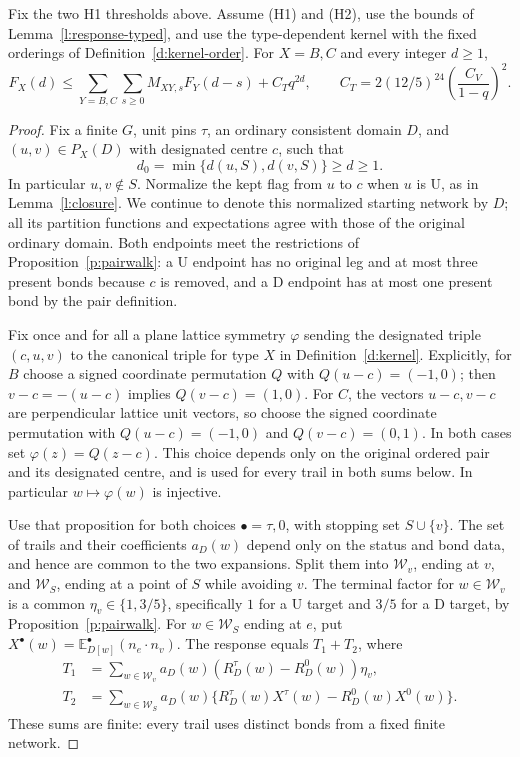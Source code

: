 \begin{lemma}\label{l:recineq}
Fix the two H1 thresholds above. Assume (H1) and (H2), use
the bounds of Lemma~\ref{l:response-typed}, and use the
type-dependent kernel with the fixed orderings of
Definition~\ref{d:kernel-order}.
For \(X=B,C\) and every integer \(d\ge1\),
\[
 F_X(d)\le\sum_{Y=B,C}\sum_{s\ge0}M_{XY,s}F_Y(d-s)+C_Tq^{2d},
 \qquad
 C_T=2(12/5)^{24}\left(\frac{C_V}{1-q}\right)^2 .
\]
\end{lemma}

\begin{proof}
Fix a finite \(G\), unit pins \(\tau\), an ordinary consistent
domain \(D\), and \((u,v)\in P_X(D)\) with designated centre
\(c\), such that
\[
 d_0=\min\{d(u,S),d(v,S)\}\ge d\ge1.
\]
In particular \(u,v\notin S\).  Normalize the kept flag from
\(u\) to \(c\) when \(u\) is \(\mathrm U\), as in
Lemma~\ref{l:closure}.  We continue to denote this normalized
starting network by \(D\); all its partition functions and
expectations agree with those of the original ordinary domain.
Both endpoints meet the restrictions of Proposition~\ref{p:pairwalk}:
a \(\mathrm U\) endpoint has no original leg and at most three
present bonds because \(c\) is removed, and a \(\mathrm D\)
endpoint has at most one present bond by the pair definition.

Fix once and for all a plane lattice symmetry \(\varphi\) sending
the designated triple \((c,u,v)\) to the canonical triple for
type \(X\) in Definition~\ref{d:kernel}.  Explicitly, for \(B\)
choose a signed coordinate permutation \(Q\) with
\(Q(u-c)=(-1,0)\); then \(v-c=-(u-c)\) implies
\(Q(v-c)=(1,0)\).  For \(C\), the vectors \(u-c,v-c\) are
perpendicular lattice unit vectors, so choose the signed coordinate
permutation with \(Q(u-c)=(-1,0)\) and \(Q(v-c)=(0,1)\).
In both cases set \(\varphi(z)=Q(z-c)\).  This choice depends
only on the original ordered pair and its designated centre,
and is used for every trail in both sums below.  In particular
\(w\mapsto\varphi(w)\) is injective.

Use that proposition for both choices \(\bullet=\tau,0\), with
stopping set \(S\cup\{v\}\).  The set of trails and their
coefficients \(a_D(w)\) depend only on the status and bond data,
and hence are common to the two expansions.  Split them into
\(\mathcal W_v\), ending at \(v\), and \(\mathcal W_S\),
ending at a point of \(S\) while avoiding \(v\).  The terminal
factor for \(w\in\mathcal W_v\) is a common
\(\eta_v\in\{1,3/5\}\), specifically \(1\) for a
\(\mathrm U\) target and \(3/5\) for a \(\mathrm D\) target,
by Proposition~\ref{p:pairwalk}.  For \(w\in\mathcal W_S\) ending
at \(e\), put
\(X^\bullet(w)=\mathbb E_{D[w]}^\bullet(n_e\cdot n_v)\).
The response equals \(T_1+T_2\), where
\begin{align*}
 T_1&=\sum_{w\in\mathcal W_v}a_D(w)
                 (R_D^\tau(w)-R_D^0(w))\eta_v,\\
 T_2&=\sum_{w\in\mathcal W_S}a_D(w)
              \{R_D^\tau(w)X^\tau(w)-R_D^0(w)X^0(w)\}.
\end{align*}
These sums are finite: every trail uses distinct bonds from a
fixed finite network.


\end{proof}
